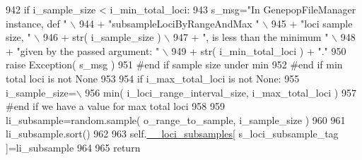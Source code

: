 \begin{DoxyCode}
942             \textcolor{keywordflow}{if} i\_sample\_size < i\_min\_total\_loci:
943                 s\_msg=\textcolor{stringliteral}{"In GenepopFileManager instance, def "} \(\backslash\)
944                             + \textcolor{stringliteral}{"subsampleLociByRangeAndMax "} \(\backslash\)
945                             + \textcolor{stringliteral}{"loci sample size, "} \(\backslash\)
946                             + str( i\_sample\_size )  \(\backslash\)
947                             + \textcolor{stringliteral}{", is less than the minimum "} \(\backslash\)
948                             + \textcolor{stringliteral}{"given by the passed argument: "}  \(\backslash\)
949                             + str( i\_min\_total\_loci ) + \textcolor{stringliteral}{"."}
950                 \textcolor{keywordflow}{raise} Exception( s\_msg )
951             \textcolor{comment}{#end if sample size under min}
952         \textcolor{comment}{#end if min total loci is not None}
953 
954         \textcolor{keywordflow}{if} i\_max\_total\_loci \textcolor{keywordflow}{is} \textcolor{keywordflow}{not} \textcolor{keywordtype}{None}:
955             i\_sample\_size=\(\backslash\)
956                     min( i\_loci\_range\_interval\_size, i\_max\_total\_loci ) 
957         \textcolor{comment}{#end if we have a value for max total loci }
958 
959         li\_subsample=random.sample( o\_range\_to\_sample, i\_sample\_size )
960 
961         li\_subsample.sort()
962 
963         self.\hyperlink{classnegui_1_1genepopfilemanager_1_1GenepopFileManager_af867ba70728e8a3aaf0097ddd6399e28}{\_\_loci\_subsamples}[ s\_loci\_subsample\_tag ]=li\_subsample
964 
965         \textcolor{keywordflow}{return}
\end{DoxyCode}
